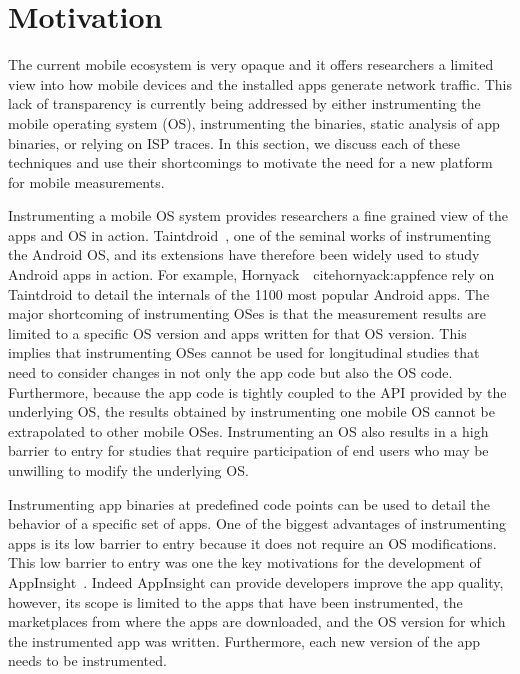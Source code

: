 \section{Motivation}
\label{sec:motivation}

The current mobile ecosystem is very opaque and it offers researchers  a
limited view into how mobile devices and the installed apps generate
network traffic. This lack of transparency is currently being addressed by
either instrumenting the mobile operating system (OS), instrumenting the
binaries, static analysis of app binaries, or relying on ISP traces. In
this section, we discuss each of these techniques and use their 
shortcomings to motivate the need for a new platform for mobile
measurements.      

Instrumenting a mobile OS system provides researchers a fine grained view
of the apps and OS in action. Taintdroid~\cite{enck:taintdroid}, one of the
seminal works of instrumenting the Android OS, and its extensions have
therefore been widely used to study Android apps in action. For example,
Hornyack~\etal~cite{hornyack:appfence} rely on Taintdroid to detail the
internals of the 1100 most popular Android apps. The major shortcoming of
instrumenting OSes is that the measurement results are limited to a 
specific OS version and apps written for that OS version. This implies that
instrumenting OSes cannot be used for longitudinal studies that need to
consider changes in not only the app code but also the OS code. 
Furthermore, because the app code is tightly coupled to the API provided by
the underlying OS, the results obtained by instrumenting  one mobile OS
cannot be extrapolated to other mobile OSes. Instrumenting an OS also
results in a high barrier to entry for studies that require participation
of end users  who may be unwilling to modify the underlying OS. 

Instrumenting app binaries at predefined code points can be used to detail the behavior of a specific set of apps. One of the biggest advantages of  instrumenting apps is its low barrier to entry because it does not require an OS modifications. This low barrier to entry was one the key motivations for the development of AppInsight~\cite{ravindranath:appinsight}. Indeed AppInsight can provide developers improve the app quality, however, its scope is limited to the apps that have been instrumented, the marketplaces from where the apps are downloaded, and the OS version for which the instrumented app was written. Furthermore, each new version of the app needs to be instrumented.

